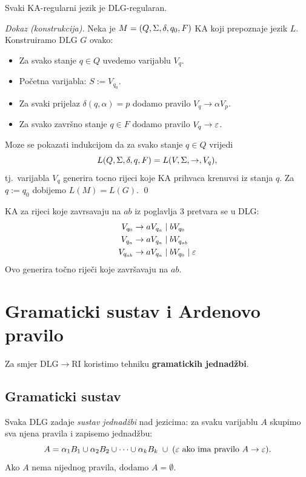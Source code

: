 \begin{propozicija}
Svaki KA-regularni jezik je DLG-regularan.
\end{propozicija}

\textit{Dokaz (konstrukcija).}
Neka je $M = (Q, \Sigma, \delta, q_0, F)$ KA koji prepoznaje jezik $L$.
Konstruiramo DLG $G$ ovako:
\begin{itemize}
  \item Za svako stanje $q \in Q$ uvedemo varijablu $V_q$.
  \item Početna varijabla: $S := V_{q_0}$.
  \item Za svaki prijelaz $\delta(q, \alpha) = p$ dodamo pravilo
        $V_q \to \alpha V_p$.
  \item Za svako završno stanje $q \in F$ dodamo pravilo $V_q \to \varepsilon$.
\end{itemize}
Moze se pokazati indukcijom da za svako stanje $q \in Q$ vrijedi
\[
  L(Q, \Sigma, \delta, q, F) = L(V, \Sigma, \to, V_q),
\]
tj.\ varijabla $V_q$ generira tocno rijeci koje KA prihvaca krenuvsi
iz stanja $q$. Za $q := q_0$ dobijemo $L(M) = L(G)$. \qed

\begin{primjer}
KA za rijeci koje zavrsavaju na $ab$ iz poglavlja 3 pretvara se u DLG:
\begin{align*}
  V_{q_0} &\to a V_{q_a} \mid b V_{q_0} \\
  V_{q_a} &\to a V_{q_a} \mid b V_{q_{ab}} \\
  V_{q_{ab}} &\to a V_{q_a} \mid b V_{q_0} \mid \varepsilon
\end{align*}
Ovo generira točno riječi koje završavaju na $ab$.
\end{primjer}

\section{Gramaticki sustav i Ardenovo pravilo}

Za smjer $\mathrm{DLG} \to \mathrm{RI}$ koristimo tehniku
\textbf{gramatickih jednadžbi}.

\subsection{Gramaticki sustav}

Svaka DLG zadaje \emph{sustav jednadžbi} nad jezicima: za svaku
varijablu $A$ skupimo sva njena pravila i zapisemo jednadžbu:
\[
  A = \alpha_1 B_1 \cup \alpha_2 B_2 \cup \cdots \cup \alpha_k B_k
  \;\cup\; (\varepsilon \text{ ako ima pravilo } A \to \varepsilon).
\]
Ako $A$ nema nijednog pravila, dodamo $A = \emptyset$.

